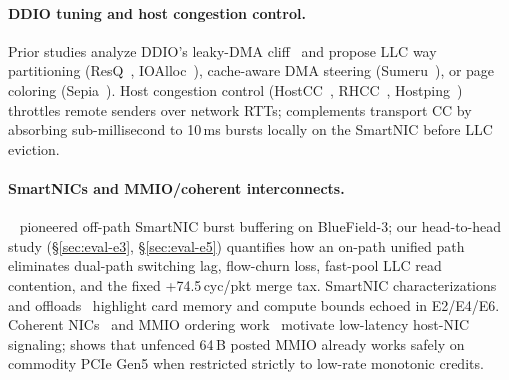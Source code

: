 \paragraph{DDIO tuning and host congestion control.}
Prior studies analyze DDIO's leaky-DMA cliff~\cite{farshin2020ddio,farshin2019llc,
wang2022ddio,neugebauer2018pcie,cai2021hoststack,vuppalapati2024hostnet} and
propose LLC way partitioning (ResQ~\cite{tootoonchian2018resq},
IOAlloc~\cite{yuan2021ioalloc}), cache-aware DMA steering
(Sumeru~\cite{wang2026sumeru}), or page coloring (Sepia~\cite{song2026sepia}).
Host congestion control (HostCC~\cite{agarwal2023hostcc},
RHCC~\cite{wan2025rhcc}, Hostping~\cite{liu2023hostping}) throttles remote
senders over network RTTs; \sys{} complements transport CC by absorbing
sub-millisecond to 10\,ms bursts locally on the SmartNIC before LLC eviction.

\paragraph{SmartNICs and MMIO/coherent interconnects.}
\ceio{}~\cite{liu2025ceio} pioneered off-path SmartNIC burst buffering on
BlueField-3; our head-to-head study (\S\ref{sec:eval-e3}, \S\ref{sec:eval-e5})
quantifies how an on-path unified path eliminates dual-path switching lag,
flow-churn loss, fast-pool LLC read contention, and the fixed +74.5\,cyc/pkt
merge tax. SmartNIC characterizations~\cite{wei2023smartnic,liu2026smartnic}
and offloads~\cite{kim2021linefs,lazarev2021dagger} highlight card memory and
compute bounds echoed in E2/E4/E6. Coherent NICs~\cite{schuh2024ccnic,cxlnic2025}
and MMIO ordering work~\cite{liew2025hotos,liew2026asplos,kalia2016rdma,
kalia2019erpc,maffione2019spsc} motivate low-latency host-NIC signaling; \sys{}
shows that unfenced 64\,B posted MMIO already works safely on commodity PCIe
Gen5 when restricted strictly to low-rate monotonic credits.
